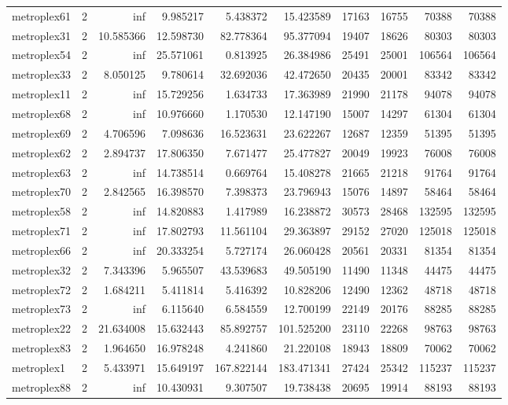 \begin{longtable}{|l|r|r|r|r|r|r|r|r|r|}
metroplex61 & 2 & inf & 9.985217 & 5.438372 & 15.423589 & 17163 & 16755 & 70388 & 70388 \\
metroplex31 & 2 & 10.585366 & 12.598730 & 82.778364 & 95.377094 & 19407 & 18626 & 80303 & 80303 \\
metroplex54 & 2 & inf & 25.571061 & 0.813925 & 26.384986 & 25491 & 25001 & 106564 & 106564 \\
metroplex33 & 2 & 8.050125 & 9.780614 & 32.692036 & 42.472650 & 20435 & 20001 & 83342 & 83342 \\
metroplex11 & 2 & inf & 15.729256 & 1.634733 & 17.363989 & 21990 & 21178 & 94078 & 94078 \\
metroplex68 & 2 & inf & 10.976660 & 1.170530 & 12.147190 & 15007 & 14297 & 61304 & 61304 \\
metroplex69 & 2 & 4.706596 & 7.098636 & 16.523631 & 23.622267 & 12687 & 12359 & 51395 & 51395 \\
metroplex62 & 2 & 2.894737 & 17.806350 & 7.671477 & 25.477827 & 20049 & 19923 & 76008 & 76008 \\
metroplex63 & 2 & inf & 14.738514 & 0.669764 & 15.408278 & 21665 & 21218 & 91764 & 91764 \\
metroplex70 & 2 & 2.842565 & 16.398570 & 7.398373 & 23.796943 & 15076 & 14897 & 58464 & 58464 \\
metroplex58 & 2 & inf & 14.820883 & 1.417989 & 16.238872 & 30573 & 28468 & 132595 & 132595 \\
metroplex71 & 2 & inf & 17.802793 & 11.561104 & 29.363897 & 29152 & 27020 & 125018 & 125018 \\
metroplex66 & 2 & inf & 20.333254 & 5.727174 & 26.060428 & 20561 & 20331 & 81354 & 81354 \\
metroplex32 & 2 & 7.343396 & 5.965507 & 43.539683 & 49.505190 & 11490 & 11348 & 44475 & 44475 \\
metroplex72 & 2 & 1.684211 & 5.411814 & 5.416392 & 10.828206 & 12490 & 12362 & 48718 & 48718 \\
metroplex73 & 2 & inf & 6.115640 & 6.584559 & 12.700199 & 22149 & 20176 & 88285 & 88285 \\
metroplex22 & 2 & 21.634008 & 15.632443 & 85.892757 & 101.525200 & 23110 & 22268 & 98763 & 98763 \\
metroplex83 & 2 & 1.964650 & 16.978248 & 4.241860 & 21.220108 & 18943 & 18809 & 70062 & 70062 \\
metroplex1 & 2 & 5.433971 & 15.649197 & 167.822144 & 183.471341 & 27424 & 25342 & 115237 & 115237 \\
metroplex88 & 2 & inf & 10.430931 & 9.307507 & 19.738438 & 20695 & 19914 & 88193 & 88193 \\

\end{longtable}
